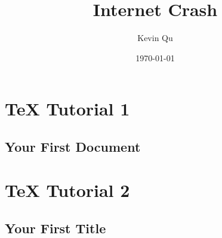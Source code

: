 \documentclass{article}
\begin{document}
\title{Internet Crash}
\author{Kevin Qu}
\date{\today}
\maketitle%
\thispagestyle{empty}%
\setcounter{page}{1}
\newpage

\tableofcontents
{}%
\clearpage
{}

\section{TeX Tutorial 1}

\subsection{Your First Document}
\lipsum

\section{TeX Tutorial 2}

\subsection{Your First Title}
\end{document}
